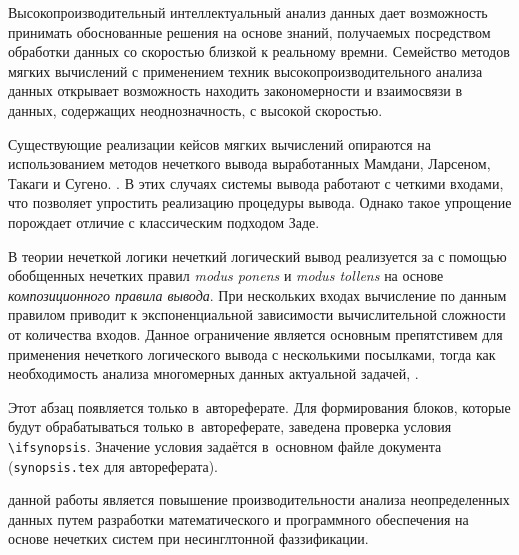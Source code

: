 
{\actuality} Высокопроизводительный интеллектуальный анализ данных дает возможность принимать обоснованные решения на основе знаний, получаемых посредством обработки данных со скоростью близкой к реальному времни. Семейство методов мягких вычислений с применением техник высокопроизводительного анализа данных открывает возможность находить закономерности и взаимосвязи в данных, содержащих неоднозначность, с высокой скоростью.

Существующие реализации кейсов мягких вычислений опираются на использованием методов нечеткого вывода выработанных Мамдани, Ларсеном, Такаги и Сугено. . В этих случаях системы вывода работают с четкими входами, что позволяет упростить реализацию процедуры вывода. Однако такое упрощение порождает отличие с классическим подходом Заде.

В теории нечеткой логики нечеткий логический вывод реализуется за с помощью обобщенных нечетких правил \textit{modus ponens} и \textit{modus tollens} на основе \textit{композиционного правила вывода}. При нескольких входах вычисление по данным правилом приводит к экспоненциальной зависимости вычислительной сложности от количества входов. Данное ограничение является основным препятстивем для применения нечеткого логического вывода с несколькими посылками, тогда как необходимость анализа многомерных данных  актуальной задачей, .




\ifsynopsis
Этот абзац появляется только в~автореферате.
Для формирования блоков, которые будут обрабатываться только в~автореферате,
заведена проверка условия \verb!\!\verb!ifsynopsis!.
Значение условия задаётся в~основном файле документа (\verb!synopsis.tex! для
автореферата).
\else
\fi


{\aim} данной работы является повышение производительности анализа неопределенных данных путем разработки математического и программного обеспечения на основе нечетких систем при несинглтонной фаззификации.

